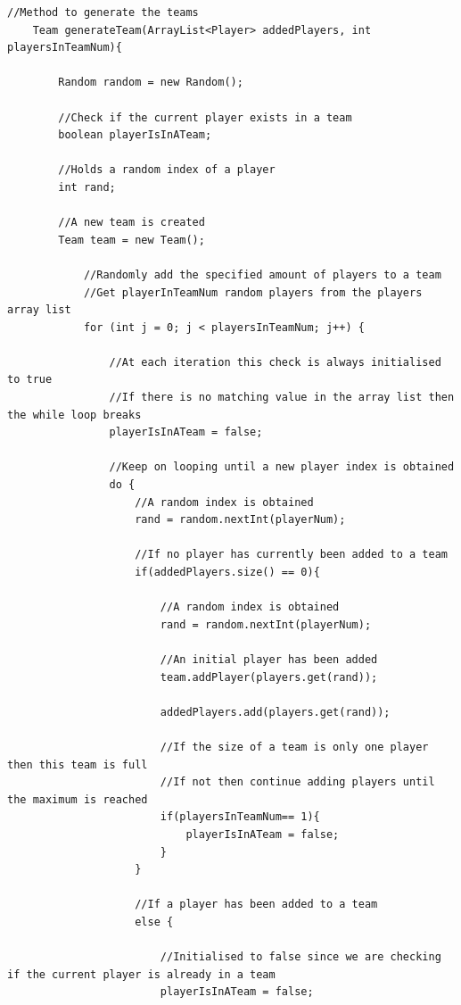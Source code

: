 \documentclass[a4paper,12pt]{extarticle}
\begin{document}
\newpage
\begin{lstlisting}
//Method to generate the teams
    Team generateTeam(ArrayList<Player> addedPlayers, int playersInTeamNum){

        Random random = new Random();

        //Check if the current player exists in a team
        boolean playerIsInATeam;

        //Holds a random index of a player
        int rand;

        //A new team is created
        Team team = new Team();

            //Randomly add the specified amount of players to a team
            //Get playerInTeamNum random players from the players array list
            for (int j = 0; j < playersInTeamNum; j++) {

                //At each iteration this check is always initialised to true
                //If there is no matching value in the array list then the while loop breaks
                playerIsInATeam = false;

                //Keep on looping until a new player index is obtained
                do {
                    //A random index is obtained
                    rand = random.nextInt(playerNum);

                    //If no player has currently been added to a team
                    if(addedPlayers.size() == 0){

                        //A random index is obtained
                        rand = random.nextInt(playerNum);

                        //An initial player has been added
                        team.addPlayer(players.get(rand));

                        addedPlayers.add(players.get(rand));

                        //If the size of a team is only one player then this team is full
                        //If not then continue adding players until the maximum is reached
                        if(playersInTeamNum== 1){
                            playerIsInATeam = false;
                        }
                    }

                    //If a player has been added to a team
                    else {

                        //Initialised to false since we are checking if the current player is already in a team
                        playerIsInATeam = false;


\end{lstlisting}
\end{document}
